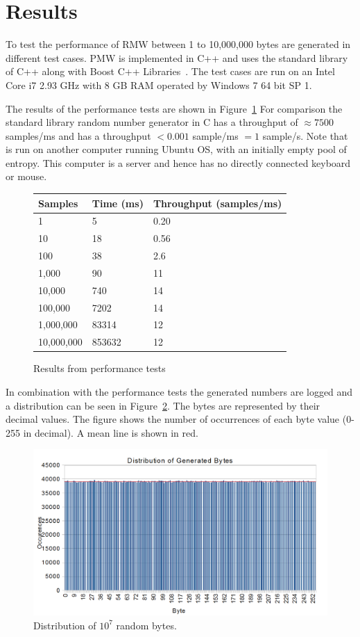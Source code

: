 \section{Results}
\label{sec:result}
To test the performance of RMW between 1 to 10,000,000 bytes are generated in different test cases.
PMW is implemented in C++ and uses the standard library of C++ along with Boost C++ Libraries~\citep{boost}.
The test cases are run on an Intel Core i7 2.93 GHz with 8 GB RAM operated by Windows 7 64 bit SP 1.

The results of the performance tests are shown in Figure~\ref{tab:tests}
For comparison the standard library random number generator in C has a throughput of $\approx 7500$ samples/ms and \devrandom{} has a throughput $<0.001$ sample/ms $=1$ sample/s.
Note that \devrandom{} is run on another computer running Ubuntu OS, with an initially empty pool of entropy.
This computer is a server and hence has no directly connected keyboard or mouse.

\begin{figure}[hbt]
	\centering
		\begin{tabular}{|l|l|l|}
			\hline
			Samples&Time (ms)&Throughput (samples/ms)\\
			\hline
			1&5&0.20\\
			\hline
			10&18&0.56\\
			\hline
			100&38&2.6\\
			\hline
			1,000&90&11\\
			\hline
			10,000&740&14\\
			\hline
			100,000&7202&14\\
			\hline
			1,000,000&83314&12\\
			\hline
			10,000,000&853632&12\\
			\hline
		\end{tabular}
	\caption{Results from performance tests}
	\label{tab:tests}
\end{figure}

In combination with the performance tests the generated numbers are logged and a distribution can be seen in Figure~\ref{fig:distribution}.
The bytes are represented by their decimal values.
The figure shows the number of occurrences of each byte value (0-255 in decimal).
A mean line is shown in red.

\begin{figure}[hbt]
	\centering
		\includegraphics[width=\columnwidth]{image/distribution.png}
	\caption{Distribution of $10^7$ random bytes.}
	\label{fig:distribution}
\end{figure}
